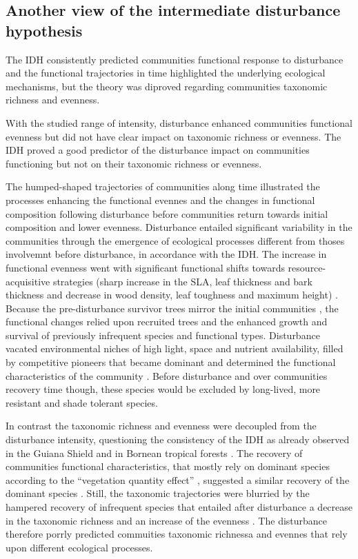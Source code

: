 \documentclass[fleqn,10pt]{ArtEcoFoG} %
\theoremstyle{definition}
\theoremstyle{definition}
\theoremstyle{definition}
\theoremstyle{remark}
\begin{document}
\subsection{Another view of the intermediate disturbance
hypothesis}\label{another-view-of-the-intermediate-disturbance-hypothesis}

The IDH consistently predicted communities functional response to
disturbance and the functional trajectories in time highlighted the
underlying ecological mechanisms, but the theory was diproved regarding
communities taxonomic richness and evenness.

With the studied range of intensity, disturbance enhanced communities
functional evenness but did not have clear impact on taxonomic richness
or evenness. The IDH proved a good predictor of the disturbance impact
on communities functioning but not on their taxonomic richness or
evenness.

The humped-shaped trajectories of communities along time illustrated the
processes enhancing the functional evennes and the changes in functional
composition following disturbance before communities return towards
initial composition and lower evenness. Disturbance entailed significant
variability in the communities through the emergence of ecological
processes different from thoses involvemnt before disturbance, in
accordance with the IDH. The increase in functional evenness went with
significant functional shifts towards resource-acquisitive strategies
(sharp increase in the SLA, leaf thickness and bark thickness and
decrease in wood density, leaf toughness and maximum height)
\citep{Westoby1998, Wright2004, Reich2014}. Because the pre-disturbance
survivor trees mirror the initial communities \citep{Herault2018}, the
functional changes relied upon recruited trees and the enhanced growth
and survival of previously infrequent species and functional types.
Disturbance vacated environmental niches of high light, space and
nutrient availability, filled by competitive pioneers that became
dominant and determined the functional characteristics of the community
\citep{Grime1998}. Before disturbance and over communities recovery time
though, these species would be excluded by long-lived, more resistant
and shade tolerant species.

In contrast the taxonomic richness and evenness were decoupled from the
disturbance intensity, questioning the consistency of the IDH as already
observed in the Guiana Shield \citep{Baraloto2012a} and in Bornean
tropical forests \citep{Cannon1998}. The recovery of communities
functional characteristics, that mostly rely on dominant species
according to the ``vegetation quantity effect'' \citep{Grime1998},
suggested a similar recovery of the dominant species \citep{Molino2001}.
Still, the taxonomic trajectories were blurried by the hampered recovery
of infrequent species that entailed after disturbance a decrease in the
taxonomic richness and an increase of the evenness
\citep{Hubbell2001, Chave2004}. The disturbance therefore porrly
predicted commuities taxonomic richnessa and evennes that rely upon
different ecological processes.
\end{document}
